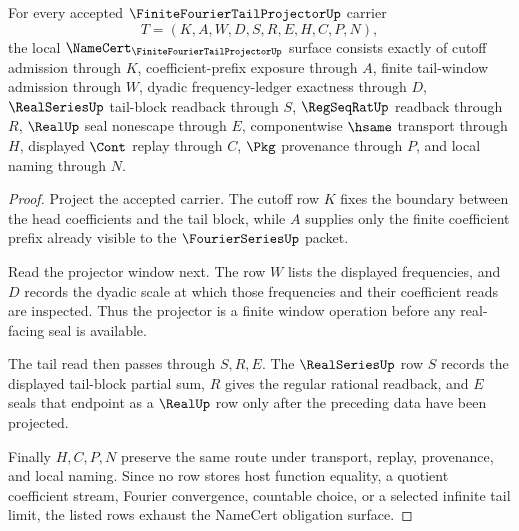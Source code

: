 \begin{theorem}
\label{thm:finite-fourier-tail-projector-namecert-obligations}
For every accepted $\FiniteFourierTailProjectorUp$ carrier
$$
T=(K,A,W,D,S,R,E,H,C,P,N),
$$
the local $\NameCert_{\FiniteFourierTailProjectorUp}$ surface consists exactly of cutoff admission through $K$, coefficient-prefix exposure through $A$, finite tail-window admission through $W$, dyadic frequency-ledger exactness through $D$, $\RealSeriesUp$ tail-block readback through $S$, $\RegSeqRatUp$ readback through $R$, $\RealUp$ seal nonescape through $E$, componentwise $\hsame$ transport through $H$, displayed $\Cont$ replay through $C$, $\Pkg$ provenance through $P$, and local naming through $N$.
\end{theorem}
\begin{proof}
Project the accepted carrier. The cutoff row $K$ fixes the boundary between the head coefficients and the tail block, while $A$ supplies only the finite coefficient prefix already visible to the $\FourierSeriesUp$ packet.

Read the projector window next. The row $W$ lists the displayed frequencies, and $D$ records the dyadic scale at which those frequencies and their coefficient reads are inspected. Thus the projector is a finite window operation before any real-facing seal is available.

The tail read then passes through $S,R,E$. The $\RealSeriesUp$ row $S$ records the displayed tail-block partial sum, $R$ gives the regular rational readback, and $E$ seals that endpoint as a $\RealUp$ row only after the preceding data have been projected.

Finally $H,C,P,N$ preserve the same route under transport, replay, provenance, and local naming. Since no row stores host function equality, a quotient coefficient stream, Fourier convergence, countable choice, or a selected infinite tail limit, the listed rows exhaust the NameCert obligation surface.
\end{proof}

